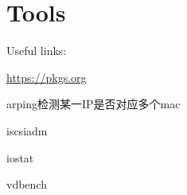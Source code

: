 \chapter{Tools}

Useful links:
\begin{enumbox}
\item \href{https://pkgs.org/}{https://pkgs.org}
\end{enumbox}

arping检测某一IP是否对应多个mac

iscsiadm

iostat

vdbench
